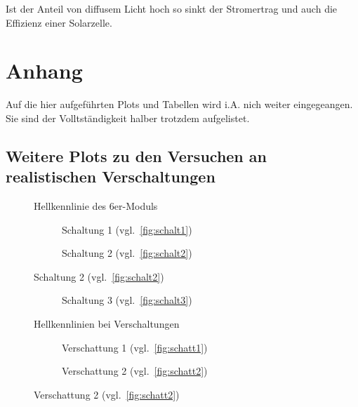 \documentclass[slug=SZ, room=Hermann-Krone-Bau\,\ Labor\ 1.25,
supervisor=Martin\ Kroll, coursedate=14.\ 11.\ 2019]{../../Lab_Report_LaTeX/lab_report}
\begin{document}
Ist der Anteil von diffusem Licht hoch so sinkt der Stromertrag und
auch die Effizienz einer Solarzelle.

\section{Anhang}
Auf die hier aufgef\"uhrten Plots und Tabellen wird i.A. nich weiter
eingegeangen. Sie sind der Volltst\"andigkeit halber trotzdem aufgelistet.

\label{sec:anh}

\subsection{Weitere Plots zu den Versuchen an realistischen Verschaltungen}
\label{sec:plotsc}

\begin{figure}[H]\centering
        
        \caption{Hellkennlinie des 6er-Moduls}
        \label{diag:hell6er}
\end{figure}

\begin{figure}[H]\centering
  \begin{subfigure}[b]{1\textwidth}\centering
    
    \caption{Schaltung 1 (vgl.~\ref{fig:schalt1})}
    \label{diag:hellschalt1}
  \end{subfigure}
  \begin{subfigure}[b]{1\textwidth}\centering
    
    \caption{Schaltung 2 (vgl.~\ref{fig:schalt2})}
    \label{diag:hellschalt2}
  \end{subfigure}
\end{figure}

\begin{figure}[H]\centering
  \ContinuedFloat
  \begin{subfigure}[b]{1\textwidth}\centering
    
    \caption{Schaltung 3 (vgl.~\ref{fig:schalt3})}
    \label{diag:hellschalt3}
  \end{subfigure}
  \caption{Hellkennlinien bei Verschaltungen}
  \label{fig:hellkenn}
\end{figure}

\begin{figure}[H]\centering
  \begin{subfigure}[b]{1\textwidth}\centering
    
    \caption{Verschattung 1 (vgl.~\ref{fig:schatt1})}
    \label{diag:verschattung1}
  \end{subfigure}
  \begin{subfigure}[b]{1\textwidth}\centering
    
    \caption{Verschattung 2 (vgl.~\ref{fig:schatt2})}
    \label{diag:verschattung2}
  \end{subfigure}
\end{figure}
\end{document}
